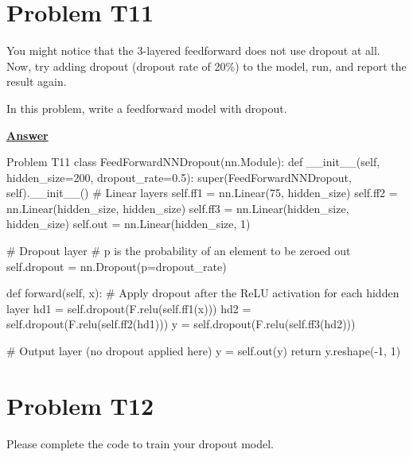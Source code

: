 \documentclass[12pt, a4paper]{article}
\begin{document}
	\pagebreak

        \section{Problem T11}
            You might notice that the 3-layered feedforward does not use dropout at all.
            Now, try adding dropout (dropout rate of 20\%) to the model, run, and report the result again.

            \vspace{0.5em}

            \noindent In this problem, write a feedforward model with dropout.

			\vspace{1em}

            \noindent \underline{\textbf{Answer}}

            \vspace{0.25em}

            \begin{codeblock}{Problem T11}
                class FeedForwardNNDropout(nn.Module):
                    def __init__(self, hidden_size=200, dropout_rate=0.5):
                        super(FeedForwardNNDropout, self).__init__()
                        # Linear layers
                        self.ff1 = nn.Linear(75, hidden_size)
                        self.ff2 = nn.Linear(hidden_size, hidden_size)
                        self.ff3 = nn.Linear(hidden_size, hidden_size)
                        self.out = nn.Linear(hidden_size, 1)
                        
                        # Dropout layer
                        # p is the probability of an element to be zeroed out
                        self.dropout = nn.Dropout(p=dropout_rate)

                    def forward(self, x):
                        # Apply dropout after the ReLU activation for each hidden layer
                        hd1 = self.dropout(F.relu(self.ff1(x)))
                        hd2 = self.dropout(F.relu(self.ff2(hd1)))
                        y = self.dropout(F.relu(self.ff3(hd2)))
                        
                        # Output layer (no dropout applied here)
                        y = self.out(y)
                        return y.reshape(-1, 1)
            \end{codeblock}

	\pagebreak

        \section{Problem T12}
            \noindent Please complete the code to train your dropout model.
\end{document}
